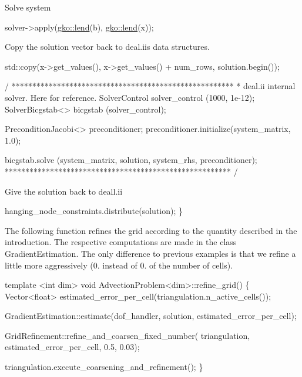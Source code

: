 Solve system


\begin{DoxyCode}
solver->apply(\hyperlink{namespacegko_aa8cb4876b72e5e1036ea9575443c439b}{gko::lend}(b), \hyperlink{namespacegko_aa8cb4876b72e5e1036ea9575443c439b}{gko::lend}(x));
\end{DoxyCode}


Copy the solution vector back to deal.\+ii\textquotesingle{}s data structures.


\begin{DoxyCode}
std::copy(x->get\_values(), x->get\_values() + num\_rows, solution.begin());

/ ******************************************************
 * deal.ii \textcolor{keyword}{internal} solver. Here \textcolor{keywordflow}{for} reference.
 SolverControl           solver\_control (1000, 1e-12);
 SolverBicgstab<>        bicgstab (solver\_control);

 PreconditionJacobi<> preconditioner;
 preconditioner.initialize(system\_matrix, 1.0);

 bicgstab.solve (system\_matrix, solution, system\_rhs,
                 preconditioner);
******************************************************* /
\end{DoxyCode}


Give the solution back to deall.\+ii


\begin{DoxyCode}
    hanging\_node\_constraints.distribute(solution);
\}
\end{DoxyCode}


The following function refines the grid according to the quantity described in the introduction. The respective computations are made in the class {\ttfamily Gradient\+Estimation}. The only difference to previous examples is that we refine a little more aggressively (0. instead of 0. of the number of cells).


\begin{DoxyCode}
\textcolor{keyword}{template} <\textcolor{keywordtype}{int} dim>
\textcolor{keywordtype}{void} AdvectionProblem<dim>::refine\_grid()
\{
    Vector<float> estimated\_error\_per\_cell(triangulation.n\_active\_cells());

    GradientEstimation::estimate(dof\_handler, solution,
                                 estimated\_error\_per\_cell);

    GridRefinement::refine\_and\_coarsen\_fixed\_number(
        triangulation, estimated\_error\_per\_cell, 0.5, 0.03);

    triangulation.execute\_coarsening\_and\_refinement();
\}
\end{DoxyCode}


